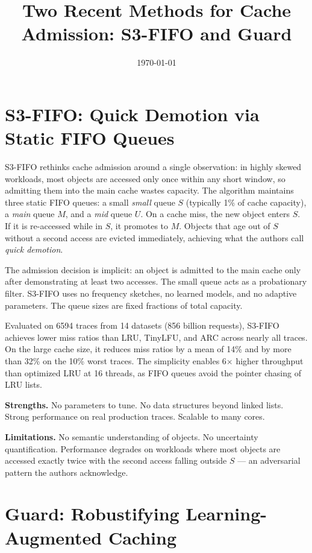 \documentclass[11pt,letterpaper]{article}
\title{Two Recent Methods for Cache Admission: S3-FIFO and Guard}
\author{}
\date{\today}
\begin{document}
\maketitle

\section{S3-FIFO: Quick Demotion via Static FIFO Queues}

S3-FIFO \citep{Yang2023} rethinks cache admission around a single observation: in highly skewed workloads, most objects are accessed only once within any short window, so admitting them into the main cache wastes capacity. The algorithm maintains three static FIFO queues: a small \textit{small} queue $S$ (typically 1\% of cache capacity), a \textit{main} queue $M$, and a \textit{mid} queue $U$. On a cache miss, the new object enters $S$. If it is re-accessed while in $S$, it promotes to $M$. Objects that age out of $S$ without a second access are evicted immediately, achieving what the authors call \textit{quick demotion}.

The admission decision is implicit: an object is admitted to the main cache only after demonstrating at least two accesses. The small queue acts as a probationary filter. S3-FIFO uses no frequency sketches, no learned models, and no adaptive parameters. The queue sizes are fixed fractions of total capacity.

Evaluated on 6594 traces from 14 datasets (856 billion requests), S3-FIFO achieves lower miss ratios than LRU, TinyLFU, and ARC across nearly all traces. On the large cache size, it reduces miss ratios by a mean of 14\% and by more than 32\% on the 10\% worst traces. The simplicity enables 6$\times$ higher throughput than optimized LRU at 16 threads, as FIFO queues avoid the pointer chasing of LRU lists.

\textbf{Strengths.} No parameters to tune. No data structures beyond linked lists. Strong performance on real production traces. Scalable to many cores.

\textbf{Limitations.} No semantic understanding of objects. No uncertainty quantification. Performance degrades on workloads where most objects are accessed exactly twice with the second access falling outside $S$ --- an adversarial pattern the authors acknowledge.

\section{Guard: Robustifying Learning-Augmented Caching}
\end{document}
